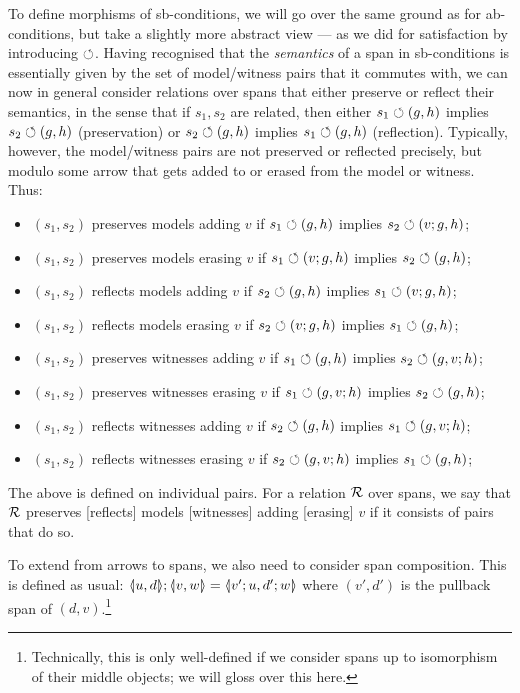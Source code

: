 To define morphisms of sb-conditions, we will go over the same ground as for ab-conditions, but take a slightly more abstract view --- as we did for satisfaction by introducing $\circlearrowleft$. Having recognised that the \emph{semantics} of a span in sb-conditions is essentially given by the set of model/witness pairs that it commutes with, we can now in general consider relations over spans that either preserve or reflect their semantics, in the sense that if $s_1,s_2$ are related, then either $s_1\circlearrowleft (g,h)$ implies $s_2\circlearrowleft (g,h)$ (preservation) or $s_2\circlearrowleft (g,h)$ implies $s_1\circlearrowleft (g,h)$ (reflection). Typically, however, the model/witness pairs are not preserved or reflected precisely, but modulo some arrow that gets added to or erased from the model or witness. Thus:
%
\begin{itemize}
\item $(s_1,s_2)$ preserves models adding $v$ if $s_1\circlearrowleft (g,h)$ implies $s_2\circlearrowleft (v;g,h)$;
\item $(s_1,s_2)$ preserves models erasing $v$ if $s_1\circlearrowleft (v;g,h)$ implies $s_2\circlearrowleft (g,h)$;
\item $(s_1,s_2)$ reflects models adding $v$ if $s_2\circlearrowleft (g,h)$ implies $s_1\circlearrowleft (v;g,h)$;
\item $(s_1,s_2)$ reflects models erasing $v$ if $s_2\circlearrowleft (v;g,h)$ implies $s_1\circlearrowleft (g,h)$;
\item $(s_1,s_2)$ preserves witnesses adding $v$ if $s_1\circlearrowleft (g,h)$ implies $s_2\circlearrowleft (g,v;h)$;
\item $(s_1,s_2)$ preserves witnesses erasing $v$ if $s_1\circlearrowleft (g,v;h)$ implies $s_2\circlearrowleft (g,h)$;
\item $(s_1,s_2)$ reflects witnesses adding $v$ if $s_2\circlearrowleft (g,h)$ implies $s_1\circlearrowleft (g,v;h)$;
\item $(s_1,s_2)$ reflects witnesses erasing $v$ if $s_2\circlearrowleft (g,v;h)$ implies $s_1\circlearrowleft (g,h)$;
\end{itemize}
%
The above is defined on individual pairs. For a relation $\mathcal{R}$ over spans, we say that $\mathcal{R}$ preserves [reflects] models [witnesses] adding [erasing] $v$ if it consists of pairs that do so.

To extend  from arrows to spans, we also need to consider span composition. This is defined as usual: $\spanof u d;\spanof v w=\spanof{v';u}{d';w}$ where $(v',d')$ is the pullback span of $(d,v)$.\footnote{Technically, this is only well-defined if we consider spans up to isomorphism of their middle objects; we will gloss over this here.}

